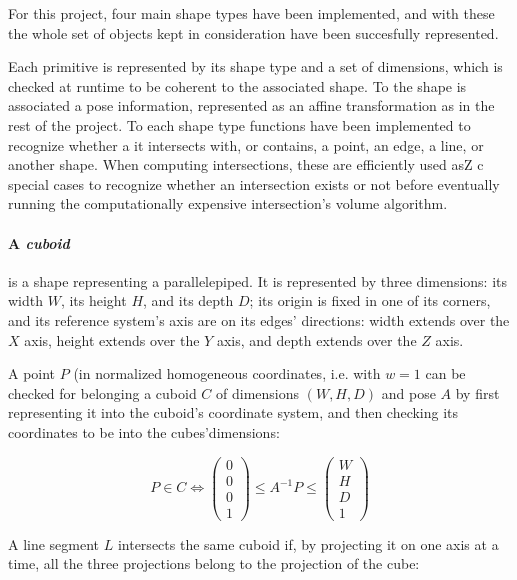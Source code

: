 For this project, four main shape types have been implemented, and with these
the whole set of objects kept in consideration have been succesfully
represented.

Each primitive is represented by its shape type and a set of dimensions, which
is checked at runtime to be coherent to the associated shape. To the shape is
associated a pose information, represented as an affine transformation as in the
rest of the project. To each shape type functions have been implemented to
recognize whether a it intersects with, or contains, a point, an edge, a line, or
another shape. When computing intersections, these are efficiently used asZ c
special cases to recognize whether an intersection exists or not before
eventually running the computationally expensive intersection's volume
algorithm.

\paragraph{A \emph{cuboid}} is a shape representing a parallelepiped. It is represented by
three dimensions: its width $W$, its height $H$, and its depth $D$; its origin is fixed in one
of its corners, and its reference system's axis are on its edges' directions:
width extends over the $X$ axis, height extends over the $Y$ axis, and depth
extends over the $Z$ axis.

A point $P$ (in normalized homogeneous coordinates, i.e. with $w=1$  can be checked for belonging a cuboid $C$ of dimensions $(W,H,D)$ and
pose $A$ by first representing it into
the cuboid's coordinate system, and then checking its coordinates to be into the
cubes'dimensions:

\begin{equation}
P \in C \Leftrightarrow \begin{pmatrix}0\\0\\0\\1\end{pmatrix} \leq A^{-1}P \leq
\begin{pmatrix}W\\H\\D\\1\end{pmatrix}
\end{equation}
  
A line segment $L$ intersects the same cuboid if, by projecting it on one axis at a time,
all the three projections belong to the projection of the cube:

